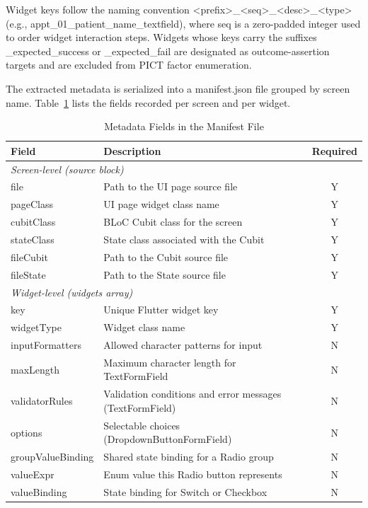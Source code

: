\documentclass[conference]{IEEEtran}
\renewcommand{\texttt}[1]{\textnormal{#1}}
\begin{document}
Widget keys follow the naming convention
\texttt{<prefix>\_\allowbreak{}<seq>\_\allowbreak{}<desc>\_\allowbreak{}<type>} (e.g.,
\texttt{appt\_\allowbreak{}01\_\allowbreak{}patient\_\allowbreak{}name\_\allowbreak{}textfield}),
where \texttt{seq} is a zero-padded integer used to order
widget interaction steps.
Widgets whose keys carry the suffixes \texttt{\_expected\_\allowbreak{}success} or
\texttt{\_expected\_\allowbreak{}fail} are designated as outcome-assertion targets
and are excluded from PICT factor enumeration.

The extracted metadata is serialized into a \texttt{manifest.json} file
grouped by screen name. Table~\ref{tab:manifest} lists the fields recorded
per screen and per widget.

\begin{table}[!t]
  \caption{Metadata Fields in the Manifest File}
  \label{tab:manifest}
  \centering
  \renewcommand{\arraystretch}{1.3}
  \begin{tabular}{lp{3.8cm}c}
    \toprule
    \textbf{Field} & \textbf{Description} & \textbf{Required} \\
    \midrule
    \multicolumn{3}{l}{\textit{Screen-level (source block)}} \\
    \texttt{file}           & Path to the UI page source file & Y \\
    \texttt{pageClass}      & UI page widget class name & Y \\
    \texttt{cubitClass}     & BLoC Cubit class for the screen & Y \\
    \texttt{stateClass}     & State class associated with the Cubit & Y \\
    \texttt{fileCubit}      & Path to the Cubit source file & Y \\
    \texttt{fileState}      & Path to the State source file & Y \\
    \midrule
    \multicolumn{3}{l}{\textit{Widget-level (widgets array)}} \\
    \texttt{key}            & Unique Flutter widget key & Y \\
    \texttt{widgetType}     & Widget class name & Y \\
    \texttt{inputFormatters}& Allowed character patterns for input & N \\
    \texttt{maxLength}      & Maximum character length for \texttt{TextFormField} & N \\
    \texttt{validatorRules} & Validation conditions and error messages (\texttt{TextFormField}) & N \\
    \texttt{options}        & Selectable choices (\texttt{Dropdown\allowbreak{}Button\allowbreak{}FormField}) & N \\
    \texttt{groupValueBinding} & Shared state binding for a \texttt{Radio} group & N \\
    \texttt{valueExpr}      & Enum value this \texttt{Radio} button represents & N \\
    \texttt{valueBinding}   & State binding for \texttt{Switch} or \texttt{Checkbox} & N \\
    \bottomrule
  \end{tabular}
\end{table}
\end{document}
